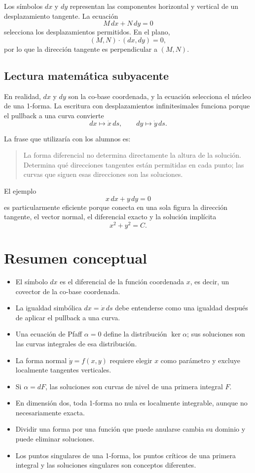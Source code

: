 \documentclass[12pt,a4paper]{article}
\begin{document}
	Los símbolos \(dx\) y \(dy\) representan las componentes horizontal y vertical de un desplazamiento tangente. La ecuación
	\[
	M\,dx+N\,dy=0
	\]
selecciona los desplazamientos permitidos. En el plano,
	\[
	(M,N)\cdot(dx,dy)=0,
	\]
por lo que la dirección tangente es perpendicular a \((M,N)\).

	\subsection{Lectura matemática subyacente}

	En realidad, \(dx\) y \(dy\) son la co-base coordenada, y la ecuación selecciona el núcleo de una 1-forma. La escritura con desplazamientos infinitesimales funciona porque el pullback a una curva convierte
	\[
	dx\mapsto\dot{x}\,ds,
	\qquad
	dy\mapsto\dot{y}\,ds.
	\]

	La frase que utilizaría con los alumnos es:

	\begin{quote}
		La forma diferencial no determina directamente la altura de la solución. Determina qué direcciones tangentes están permitidas en cada punto; las curvas que siguen esas direcciones son las soluciones.
	\end{quote}

	El ejemplo
	\[
	x\,dx+y\,dy=0
	\]
es particularmente eficiente porque conecta en una sola figura la dirección tangente, el vector normal, el diferencial exacto y la solución implícita
	\[
	x^2+y^2=C.
	\]

	\clearpage
	\section{Resumen conceptual}

	\begin{itemize}[leftmargin=*]
		\item El símbolo \(dx\) es el diferencial de la función coordenada \(x\), es decir, un covector de la co-base coordenada.
		\item La igualdad simbólica \(dx=\dot{x}\,ds\) debe entenderse como una igualdad después de aplicar el pullback a una curva.
		\item Una ecuación de Pfaff \(\alpha=0\) define la distribución \(\ker\alpha\); sus soluciones son las curvas integrales de esa distribución.
		\item La forma normal \(\dot{y}=f(x,y)\) requiere elegir \(x\) como parámetro y excluye localmente tangentes verticales.
		\item Si \(\alpha=dF\), las soluciones son curvas de nivel de una primera integral \(F\).
		\item En dimensión dos, toda 1-forma no nula es localmente integrable, aunque no necesariamente exacta.
		\item Dividir una forma por una función que puede anularse cambia su dominio y puede eliminar soluciones.
		\item Los puntos singulares de una 1-forma, los puntos críticos de una primera integral y las soluciones singulares son conceptos diferentes.
	\end{itemize}
\end{document}
